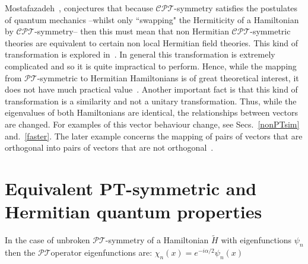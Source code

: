\documentclass[12pt, a4paper]{report}
\newcommand\PT{\(\mathcal{PT}\)}
\newcommand\CPT{\(\mathcal{CPT}\)}
\begin{document}
Mostafazadeh~\cite{Mostafazadeh}, conjectures that because \CPT-symmetry satisfies the postulates of quantum mechanics --whilst only ``swapping" the Hermiticity of a Hamiltonian by \CPT-symmetry-- then this must mean that non Hermitian \CPT-symmetric theories are equivalent to certain non local Hermitian field theories. This kind of transformation is explored in~\cite{Mostafazadeh, EquivalentHH, Pseudo-HermiticityIII, Jones_2005,taleof2potentials}.
In general this transformation is extremely complicated and so it is quite impractical to perform. Hence, while the mapping from \PT-symmetric to Hermitian Hamiltonians is of great theoretical interest, it does not have much practical value~\cite{MakingSense}. Another important fact is that this kind of transformation is a similarity and not a unitary transformation. Thus, while the eigenvalues of both Hamiltonians are identical, the relationships between vectors are changed. For examples of this vector behaviour change, see Secs.~\ref{nonPTsim} and.~\ref{faster}. The later example concerns the mapping of pairs of vectors that are orthogonal into pairs of vectors that are not orthogonal~\cite{MakingSense, Bender_2007}.

\section{Equivalent PT-symmetric and Hermitian quantum properties}\label{Dict}
In the case of unbroken \PT-symmetry of a Hamiltonian $\tilde{H}$ with eigenfunctions $\psi_n$ then the \PT\:operator eigenfunctions are: $\chi_{n}(x) = e^{-i\alpha/2}\psi_n(x)$\\
\end{document}
